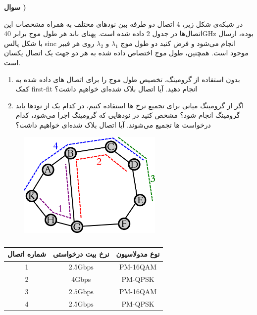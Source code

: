 \documentclass[10pt,letterpaper]{article}
\newcounter{QuestionNumber}
\newcommand{\Q}{
\textbf{سوال \theQuestionNumber)}
\stepcounter{QuestionNumber}
}
\begin{document}
\newpage

\Q

در شبکه‌ی شکل زیر، 4 اتصال دو طرفه بین نودهای مختلف به همراه مشخصات این اتصال‌ها در جدول 2 داده شده است. پهنای باند هر طول موج برابر
40GHz
بوده، ارسال با شکل پالس sinc انجام می‌شود و فرض کنید دو طول موج 
$
\lambda_1
$
و
$
\lambda_2
$
روی هر فیبر موجود است. همچنین، طول موج اختصاص داده شده به هر دو جهت یک اتصال یکسان است.

\begin{enumerate}[label=\alph*-]
\item
بدون استفاده از گرومینگ، تخصیص طول موج را برای اتصال های داده شده به کمک first-fit انجام دهید. آیا اتصال بلاک شده‌ای خواهیم داشت؟
\item
اگر از گرومینگ میانی برای تجمیع نرخ ها استفاده کنیم، در کدام یک از نودها باید گرومینگ انجام شود؟ مشخص کنید در نودهایی که گرومینگ اجرا می‌شود، کدام درخواست ها تجمیع می‌شوند. آیا اتصال بلاک شده‌ای خواهیم داشت؟
\end{enumerate}

\begin{figure}[h]
\centering
\includegraphics[width=70mm]{grooming_final.eps}
\end{figure}

\begin{table}[h]
\Large
\centering
\begin{tabular}{|c|c|c|}
\hline
شماره اتصال&نرخ بیت درخواستی&نوع مدولاسیون
\\\hline
1&$2.5\text{Gbps}$&PM-16QAM
\\\hline
2&4Gbps&PM-QPSK
\\\hline
3&$2.5\text{Gbps}$&PM-16QAM
\\\hline
4&$2.5\text{Gbps}$&PM-QPSK
\\\hline
\end{tabular}
\caption{}
\end{table}

\end{document}
